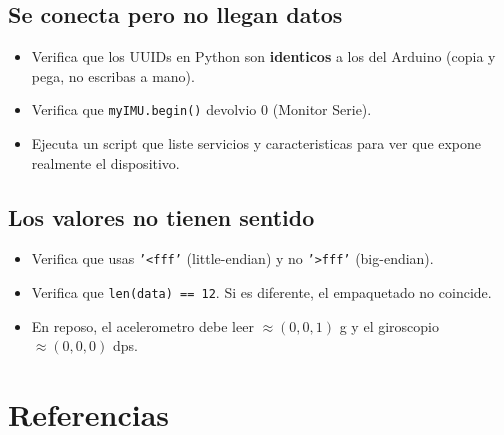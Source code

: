 \documentclass[11pt,a4paper]{article}
\begin{document}
\subsection{Se conecta pero no llegan datos}

\begin{itemize}
    \item Verifica que los UUIDs en Python son \textbf{identicos} a
          los del Arduino (copia y pega, no escribas a mano).
    \item Verifica que \texttt{myIMU.begin()} devolvio 0 (Monitor
          Serie).
    \item Ejecuta un script que liste servicios y caracteristicas
          para ver que expone realmente el dispositivo.
\end{itemize}

\subsection{Los valores no tienen sentido}

\begin{itemize}
    \item Verifica que usas \texttt{'<fff'} (little-endian) y no
          \texttt{'>fff'} (big-endian).
    \item Verifica que \texttt{len(data) == 12}. Si es diferente,
          el empaquetado no coincide.
    \item En reposo, el acelerometro debe leer $\approx (0, 0, 1)$ g
          y el giroscopio $\approx (0, 0, 0)$ dps.
\end{itemize}


\section{Referencias}
\end{document}
